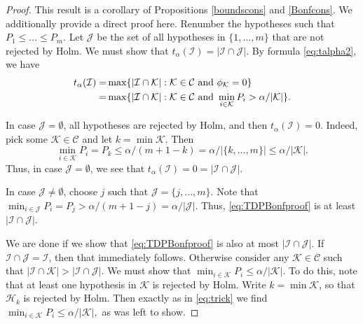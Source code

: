 \documentclass[11pt]{article}
\theoremstyle{plain}
\theoremstyle{definition}
\newcommand{\K}{\mathcal{K}}
\newcommand{\I}{\mathcal{I}}
\newcommand{\J}{\mathcal{J}}
\newcommand{\C}{\mathcal{C}}
\newcommand{\Hy}{\mathcal{H}}
\begin{document}
\begin{proof}
This result is a corollary of Propositions \ref{boundscons} and \ref{Bonfcons}. We additionally provide a direct proof here.
Renumber the hypotheses such that $P_1\leq ...\leq P_m.$ Let $\J$  be the set of all hypotheses in $\{1,...,m\}$ that are not rejected by Holm. We must show that $t_{\alpha}(\I)=|\I\cap\J|.$
By  formula \eqref{eq:talpha2}, we have
\begin{align} 
t_{\alpha}(\I) = & \max\{|\I\cap \K|: \K\in\C  \text{ and }\phi_{\K}=0\}   \notag  \\ 
= & \max\{|\I\cap \K|: \K\in\C  \text{ and }\min_{i\in \K}P_i> \alpha/|\K|\}. \label{eq:TDPBonfproof}
\end{align}




In case $\J=\emptyset$, all hypotheses are rejected by Holm, and then $t_{\alpha}(\I)=0$. Indeed, pick some  $\K\in\C $ and let $k=\min\K.$ Then  
\begin{equation} \label{eq:trick}
\min_{i\in \K}P_i =P_k \leq\alpha/(m+1-k) =\alpha/|\{k,...,m\}| \leq  \alpha/|\K|.
\end{equation}
Thus, in case $\J=\emptyset$, we see that $t_{\alpha}(\I)=0=|\I\cap\J|.$

In case $\J\neq\emptyset$,   choose $j$ such that $\J=\{j,...,m\}$. 
Note that  $\min_{i\in \J}P_i = P_j> \alpha/(m+1-j)= \alpha/|\J|$. 
Thus, \eqref{eq:TDPBonfproof} is at least 
$ |\I\cap \J|$.

We are done if we show that \eqref{eq:TDPBonfproof} is also at most $|\I\cap \J|$. If $\I\cap \J=\I$, then  that immediately follows. Otherwise consider any $\K\in \C$ such that $|\I\cap \K|> |\I\cap \J|$. We must show that $\min_{i\in \K}P_i\leq \alpha/|\K|$.
To do this, note that at least one hypothesis in $\K$ is rejected by Holm. Write  $k=\min\K$, so that $\Hy_k$ is rejected by Holm. Then exactly as in \eqref{eq:trick} we find $\min_{i\in \K}P_i \leq \alpha/|\K|,$ as was left to show.
\end{proof}
\end{document}
